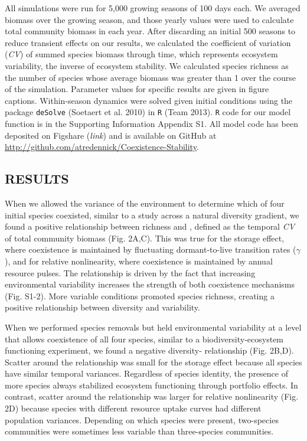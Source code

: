\documentclass[12pt,]{article}
\begin{document}
All simulations were run for 5,000 growing seasons of 100 days each. We
averaged biomass over the growing season, and those yearly values were
used to calculate total community biomass in each year. After discarding
an initial 500 seasons to reduce transient effects on our results, we
calculated the coefficient of variation (\emph{CV}) of summed species
biomass through time, which represents ecosystem variability, the
inverse of ecosystem stability. We calculated species richness as the
number of species whose average biomass was greater than 1 over the
course of the simulation. Parameter values for specific results are
given in figure captions. Within-season dynamics were solved given
initial conditions using the package \texttt{deSolve} (Soetaert et al.
2010) in \texttt{R} (Team 2013). \texttt{R} code for our model function
is in the Supporting Information Appendix S1. All model code has been
deposited on Figshare (\emph{link}) and is available on GitHub at
\url{http://github.com/atredennick/Coexistence-Stability}.

\subsection{RESULTS}\label{results}

When we allowed the variance of the environment to determine which of
four initial species coexisted, similar to a study across a natural
diversity gradient, we found a positive relationship between richness
and , defined as the temporal \emph{CV} of
total community biomass (Fig. 2A,C). This was true for the storage
effect, where coexistence is maintained by fluctuating dormant-to-live
transition rates (\(\gamma\)), and for relative nonlinearity, where
coexistence is maintained by annual resource pulses. The relationship is
driven by the fact that increasing environmental variability increases
the strength of both coexistence mechanisms (Fig. S1-2). More variable
conditions promoted species richness, creating a positive relationship
between diversity and  variability.

When we performed species removals but held environmental variability at
a level that allows coexistence of all four species, similar to a
biodiversity-ecosystem functioning experiment, we found a negative
diversity- relationship (Fig. 2B,D). Scatter
around the relationship was small for the storage effect because all
species have similar temporal variances. Regardless of species identity,
the presence of more species always stabilized ecosystem functioning
through portfolio effects. In contrast, scatter around the relationship
was larger for relative nonlinearity (Fig. 2D) because species with
different resource uptake curves had different population variances.
Depending on which species were present, two-species communities were
sometimes less variable than three-species communities.
\end{document}
